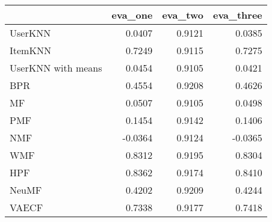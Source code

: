 \begin{tabular}{lrrr}
\toprule
{} &  eva\_one &  eva\_two &  eva\_three \\
\midrule
UserKNN            &   0.0407 &   0.9121 &     0.0385 \\
ItemKNN            &   0.7249 &   0.9115 &     0.7275 \\
UserKNN with means &   0.0454 &   0.9105 &     0.0421 \\
BPR                &   0.4554 &   0.9208 &     0.4626 \\
MF                 &   0.0507 &   0.9105 &     0.0498 \\
PMF                &   0.1454 &   0.9142 &     0.1406 \\
NMF                &  -0.0364 &   0.9124 &    -0.0365 \\
WMF                &   0.8312 &   0.9195 &     0.8304 \\
HPF                &   0.8362 &   0.9174 &     0.8410 \\
NeuMF              &   0.4202 &   0.9209 &     0.4244 \\
VAECF              &   0.7338 &   0.9177 &     0.7418 \\
\bottomrule
\end{tabular}

